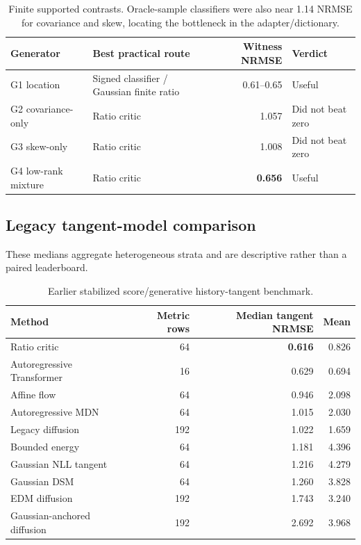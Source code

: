 \documentclass[10pt]{article}
\newcommand{\best}[1]{\ifmmode\boldsymbol{#1}\else\textbf{#1}\fi}
\begin{document}
\begin{table}[H]
\centering\small
\begin{tabularx}{\linewidth}{L{2.2cm}Y r L{2.5cm}}
\toprule Generator & Best practical route & Witness NRMSE & Verdict \\
\midrule
G1 location & Signed classifier / Gaussian finite ratio & 0.61--0.65 & Useful \\
G2 covariance-only & Ratio critic & 1.057 & Did not beat zero \\
G3 skew-only & Ratio critic & 1.008 & Did not beat zero \\
G4 low-rank mixture & Ratio critic & \best{0.656} & Useful \\
\bottomrule
\end{tabularx}
\caption{Finite supported contrasts. Oracle-sample classifiers were also near 1.14 NRMSE for covariance and skew, locating the bottleneck in the adapter/dictionary.}
\end{table}

\subsection{Legacy tangent-model comparison}

These medians aggregate heterogeneous strata and are descriptive rather than a paired leaderboard.

\begin{table}[H]
\centering\small
\begin{tabular}{lrrr}
\toprule Method & Metric rows & Median tangent NRMSE & Mean \\
\midrule
Ratio critic & 64 & \best{0.616} & 0.826 \\
Autoregressive Transformer & 16 & 0.629 & 0.694 \\
Affine flow & 64 & 0.946 & 2.098 \\
Autoregressive MDN & 64 & 1.015 & 2.030 \\
Legacy diffusion & 192 & 1.022 & 1.659 \\
Bounded energy & 64 & 1.181 & 4.396 \\
Gaussian NLL tangent & 64 & 1.216 & 4.279 \\
Gaussian DSM & 64 & 1.260 & 3.828 \\
EDM diffusion & 192 & 1.743 & 3.240 \\
Gaussian-anchored diffusion & 192 & 2.692 & 3.968 \\
\bottomrule
\end{tabular}
\caption{Earlier stabilized score/generative history-tangent benchmark.}
\end{table}
\end{document}
